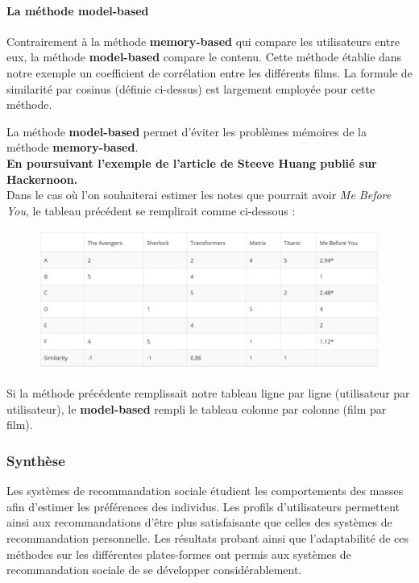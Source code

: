 \documentclass{article}
\begin{document}
\paragraph{La méthode model-based}

Contrairement à la méthode \textbf{memory-based} qui compare les utilisateurs entre eux, la méthode \textbf{model-based} compare le contenu. Cette méthode établie dans notre exemple un coefficient de corrélation entre les différents films. La formule de similarité par cosinus (définie ci-dessus) est largement employée pour cette méthode.


La méthode \textbf{model-based} permet d'éviter les problèmes mémoires de la méthode \textbf{memory-based}. \\

\textbf{En poursuivant l'exemple de l'article de Steeve Huang publié sur Hackernoon.}\\

Dans le cas où l'on souhaiterai estimer les notes que pourrait avoir \emph{Me Before You}, le tableau précédent se remplirait comme ci-dessous :

\begin{figure}[h]
    \centering
    \includegraphics[scale=0.27]{Images/tab3.png}
\end{figure}

Si la méthode précédente remplissait notre tableau ligne par ligne (utilisateur par utilisateur), le \textbf{model-based} rempli le tableau colonne par colonne (film par film).

\subsubsection{Synthèse}

Les systèmes de recommandation sociale étudient les comportements des masses afin d'estimer les préférences des individus. Les profils d'utilisateurs permettent ainsi aux recommandations d'être plus satisfaisante que celles des systèmes de recommandation personnelle. Les résultats probant ainsi que l'adaptabilité de ces méthodes sur les différentes plates-formes ont permis aux systèmes de recommandation sociale de se développer considérablement.
\end{document}
